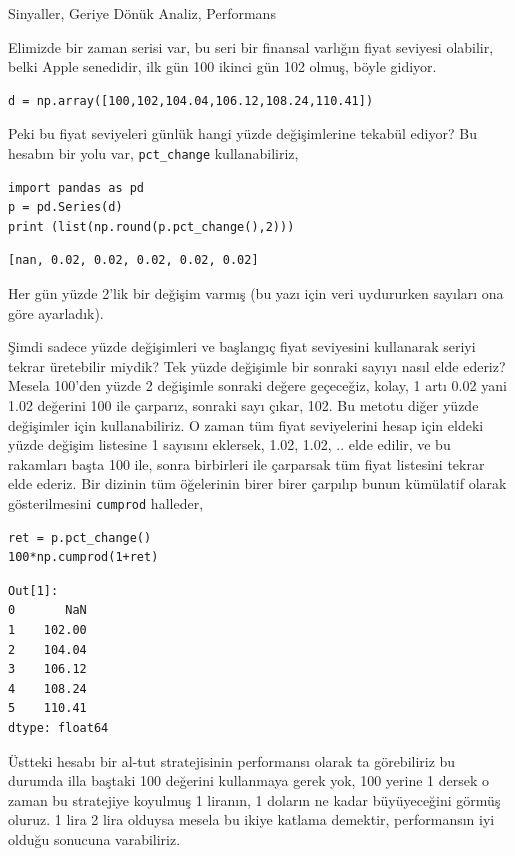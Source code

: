 \documentclass[12pt,fleqn]{article}\usepackage{../../common}
\begin{document}
Sinyaller, Geriye Dönük Analiz, Performans

Elimizde bir zaman serisi var, bu seri bir finansal varlığın fiyat seviyesi
olabilir, belki Apple senedidir, ilk gün 100 ikinci gün 102 olmuş, böyle
gidiyor.

\begin{verbatim}
d = np.array([100,102,104.04,106.12,108.24,110.41])
\end{verbatim}

Peki bu fiyat seviyeleri günlük hangi yüzde değişimlerine tekabül ediyor?
Bu hesabın bir yolu var, \verb!pct_change! kullanabiliriz,

\begin{verbatim}
import pandas as pd
p = pd.Series(d)
print (list(np.round(p.pct_change(),2)))
\end{verbatim}

\begin{verbatim}
[nan, 0.02, 0.02, 0.02, 0.02, 0.02]
\end{verbatim}

Her gün yüzde 2'lik bir değişim varmış (bu yazı için veri uydururken sayıları
ona göre ayarladık).

Şimdi sadece yüzde değişimleri ve başlangıç fiyat seviyesini kullanarak seriyi
tekrar üretebilir miydik? Tek yüzde değişimle bir sonraki sayıyı nasıl elde
ederiz?  Mesela 100'den yüzde 2 değişimle sonraki değere geçeceğiz, kolay, 1
artı 0.02 yani 1.02 değerini 100 ile çarparız, sonraki sayı çıkar, 102. Bu
metotu diğer yüzde değişimler için kullanabiliriz. O zaman tüm fiyat
seviyelerini hesap için eldeki yüzde değişim listesine 1 sayısını eklersek,
1.02, 1.02, .. elde edilir, ve bu rakamları başta 100 ile, sonra birbirleri ile
çarparsak tüm fiyat listesini tekrar elde ederiz. Bir dizinin tüm öğelerinin
birer birer çarpılıp bunun kümülatif olarak gösterilmesini \verb!cumprod!
halleder,

\begin{verbatim}
ret = p.pct_change()
100*np.cumprod(1+ret)
\end{verbatim}

\begin{verbatim}
Out[1]: 
0       NaN
1    102.00
2    104.04
3    106.12
4    108.24
5    110.41
dtype: float64
\end{verbatim}

Üstteki hesabı bir al-tut stratejisinin performansı olarak ta görebiliriz bu
durumda illa baştaki 100 değerini kullanmaya gerek yok, 100 yerine 1 dersek o
zaman bu stratejiye koyulmuş 1 liranın, 1 doların ne kadar büyüyeceğini görmüş
oluruz.  1 lira 2 lira olduysa mesela bu ikiye katlama demektir, performansın
iyi olduğu sonucuna varabiliriz.
\end{document}
